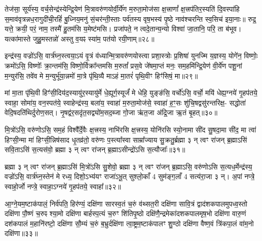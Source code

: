 तेज॑सा॒ सूर्य॑स्य॒ वर्च॒सेन्द्र॑स्येन्द्रि॒येण॑ मि॒त्रावरु॑णयोर्वी॒र्ये॑ण म॒रुता॒मोज॑सा क्ष॒त्त्राणां᳚ क्ष॒त्त्रप॑तिर॒स्यति॑ दि॒वस्पा॑हि स॒माव॑वृत्रन्नध॒रागुदी॑ची॒रहिं॑ बु॒ध्निय॒मनु॑ सं॒चर॑न्ती॒स्ताः पर्व॑तस्य वृष॒भस्य॑ पृ॒ष्ठे नाव॑श्चरन्ति स्व॒सिच॑ इया॒नाः॥ रुद्र॒ यत्ते॒ क्रयी॒ परं॒ नाम॒ तस्मै॑ हु॒तम॑सि य॒मेष्ट॑मसि। प्रजा॑पते॒ न त्वदे॒तान्य॒न्यो विश्वा॑ जा॒तानि॒ परि॒ ता ब॑भूव। यत्का॑मास्ते जुहु॒मस्तन्नो॑ अस्तु व॒यꣴ स्या॑म॒ पत॑यो रयी॒णाम्॥२८॥

{\anuvakamend[{अ॒ग्नेस्तैका॑दश च॥14॥}]}

इन्द्र॑स्य॒ वज्रो॑\-ऽसि॒ वार्त्र॑घ्न॒स्त्वया॒\-ऽयं वृ॒त्रं व॑ध्यान्मि॒त्रावरु॑णयोस्त्वा प्रशा॒स्त्रोः प्र॒शिषा॑ युनज्मि य॒ज्ञस्य॒ योगे॑न॒ विष्णोः॒ क्रमो॑\-ऽसि॒ विष्णोः᳚ क्रा॒न्तम॑सि॒ विष्णो॒र्विक्रा᳚न्तमसि म॒रुतां᳚ प्रस॒वे जे॑षमा॒प्तं मनः॒ सम॒हमि॑न्द्रि॒येण॑ वी॒र्ये॑ण पशू॒नां म॒न्युर॑सि॒ तवे॑व मे म॒न्युर्भू॑या॒न्नमो॑ मा॒त्रे पृ॑थि॒व्यै मा\-ऽहं मा॒तरं॑ पृथि॒वीꣳ हिꣳ॑सिषं॒ मा॥२९॥

मां मा॒ता पृ॑थि॒वी हिꣳ॑सी॒दिय॑द॒स्यायु॑र॒स्यायु॑र्मे धे॒ह्यूर्ग॒स्यूर्जं॑ मे धेहि॒ युङ्ङ॑सि॒ वर्चो॑\-ऽसि॒ वर्चो॒ मयि॑ धेह्य॒ग्नये॑ गृ॒हप॑तये॒ स्वाहा॒ सोमा॑य॒ वन॒स्पत॑ये॒ स्वाहेन्द्र॑स्य॒ बला॑य॒ स्वाहा॑ म॒रुता॒मोज॑से॒ स्वाहा॑ ह॒ꣳ॒सः शु॑चि॒षद्वसु॑रन्तरिक्ष॒- सद्धोता॑ वेदि॒षदति॑थिर्दुरोण॒सत्। नृ॒षद्व॑र॒सदृ॑त॒सद्व्यो॑म॒सद॒ब्जा गो॒जा ऋ॑त॒जा अ॑द्रि॒जा ऋ॒तं बृ॒हत्॥३०॥

{\anuvakamend[{हि॒ꣳ॒सि॒षं॒ मर्त॒जास्त्रीणि॑ च॥15॥}]}

मि॒त्रो॑\-ऽसि॒ वरु॑णो\-ऽसि॒ सम॒हं विश्वै᳚र्दे॒वैः क्ष॒त्त्रस्य॒ नाभि॑रसि क्ष॒त्त्रस्य॒ योनि॑रसि स्यो॒नामा सी॑द सु॒षदा॒मा सी॑द॒ मा त्वा॑ हिꣳसी॒न्मा मा॑ हिꣳसी॒न्निष॑साद धृ॒तव्र॑तो॒ वरु॑णः प॒स्त्या᳚स्वा साम्रा᳚ज्याय सु॒क्रतु॒र्ब्रह्मा ३ न् त्वꣳ रा॑जन् ब्र॒ह्मा\-ऽसि॑ सवि॒ता\-ऽसि॑ स॒त्यस॑वो॒ ब्रह्मा ३ न् त्वꣳ रा॑जन् ब्र॒ह्मा\-ऽसीन्द्रो॑\-ऽसि स॒त्यौजाः᳚॥३१॥

ब्रह्मा ३ न् त्वꣳ रा॑जन् ब्र॒ह्मा\-ऽसि॑ मि॒त्रो॑\-ऽसि सु॒शेवो॒ ब्रह्मा ३ न् त्वꣳ रा॑जन् ब्र॒ह्मा\-ऽसि॒ वरु॑णो\-ऽसि स॒त्यध॒र्मेन्द्र॑स्य॒ वज्रो॑\-ऽसि॒ वार्त्र॑घ्न॒स्तेन॑ मे रध्य॒ दिशो॒\-ऽभ्य॑यꣳ राजा॑\-ऽभू॒त् सुश्लो॒काँ 4 सुम॑ङ्ग॒लाँ 4 सत्य॑रा॒जा ३ न्। अ॒पां नप्त्रे॒ स्वाहो॒र्जो नप्त्रे॒ स्वाहा॒\-ऽग्नये॑ गृ॒हप॑तये॒ स्वाहा᳚॥३२॥

{\anuvakamend[{स॒त्यौजा᳚श्चत्वारि॒ꣳ॒शच्च॑॥16॥}]}

आ॒ग्ने॒यम॒ष्टाक॑पालं॒ निर्व॑पति॒ हिर॑ण्यं॒ दक्षि॑णा सारस्व॒तं च॒रुं व॑थ्सत॒री दक्षि॑णा सावि॒त्रं द्वाद॑शकपालमुपध्व॒स्तो दक्षि॑णा पौ॒ष्णं च॒रुꣴ श्या॒मो दक्षि॑णा बार्\mbox{}हस्प॒त्यं च॒रुꣳ शि॑तिपृ॒ष्ठो दक्षि॑णै॒न्द्रमेका॑दशकपालमृष॒भो दक्षि॑णा वारु॒णं दश॑कपालं म॒हानि॑रष्टो॒ दक्षि॑णा सौ॒म्यं च॒रुं ब॒भ्रुर्दक्षि॑णा त्वा॒ष्ट्रम॒ष्टाक॑पालꣳ शु॒ण्ठो दक्षि॑णा वैष्ण॒वं त्रि॑कपा॒लं वा॑म॒नो दक्षि॑णा॥३३॥

